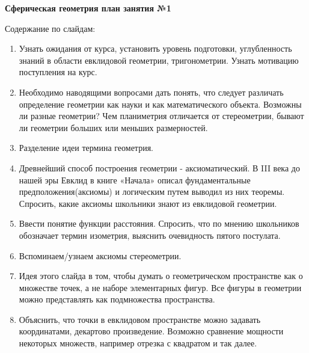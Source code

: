 


    \begin{center}
        \textbf{Сферическая геометрия план занятия №1}\\
    \end{center}

    Содержание по слайдам:
    \begin{enumerate}
        \item Узнать ожидания от курса,
        установить уровень подготовки, углубленность знаний в области евклидовой геометрии, тригонометрии.
        Узнать мотивацию поступления на курс.

        \item Необходимо наводящими вопросами дать понять, что следует различать определение
        геометрии как науки и как математического объекта.
        Возможны ли разные геометрии?
        Чем планиметрия отличается от стереометрии, бывают ли геометрии больших или меньших размерностей.

        \item Разделение идеи термина геометрия.

        \item Древнейший способ построения геометрии - аксиоматический.
        В III века до нашей эры Евклид в книге «Начала» описал фундаментальные предположения(аксиомы)
        и логическим путем выводил из них теоремы.\\
        Спросить, какие аксиомы школьники знают из евклидовой геометрии.

        \item Ввести понятие функции расстояния.
        Спросить, что по мнению школьников обозначает термин изометрия, выяснить очевидность
        пятого постулата.

        \item Вспоминаем/узнаем аксиомы стереометрии.

        \item Идея этого слайда в том, чтобы думать о геометрическом пространстве как о множестве точек,
        а не наборе элементарных фигур.
        Все фигуры в геометрии можно представлять как подмножества пространства.

        \item Объяснить, что точки в евклидовом пространстве можно задавать координатами,
        декартово произведение.
        Возможно сравнение мощности некоторых множеств, например отрезка с квадратом и так далее.


\end{enumerate}
